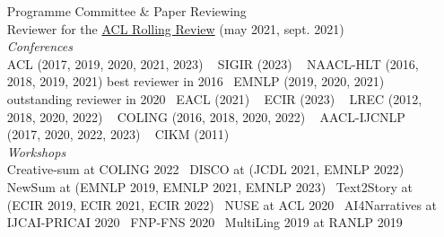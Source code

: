 \documentclass[11pt,a4paper]{article}
\begin{document}
\begin{itemize}
\begin{itemize}[
font=\normalfont\bfseries,
itemsep=.1cm,
wide=0cm,
labelsep*=.1cm]
\item[Programme Committee \& Paper Reviewing] ~\\[.2em]
  Reviewer for the \href{https://aclrollingreview.org/}{ACL Rolling Review} (may 2021, sept. 2021)\\[.2em]
  \textit{Conferences} \\[.2em]
  \hspace*{1em} ACL (2017, 2019, 2020, 2021, 2023) ~\newline
  \hspace*{1em} SIGIR (2023) ~\newline
  \hspace*{1em} NAACL-HLT (2016, 2018, 2019, 2021) \hfill best reviewer in 2016~\newline
  \hspace*{1em} EMNLP (2019, 2020, 2021) \hfill outstanding reviewer in 2020~\newline
  \hspace*{1em} EACL (2021) ~\newline
  \hspace*{1em} ECIR (2023) ~\newline
  \hspace*{1em} LREC (2012, 2018, 2020, 2022) ~\newline
  \hspace*{1em} COLING (2016, 2018, 2020, 2022) ~\newline
  \hspace*{1em} AACL-IJCNLP (2017, 2020, 2022, 2023) ~\newline
  \hspace*{1em} CIKM (2011) \\[.5em]
  \textit{Workshops} \\[.2em]
  \hspace*{1em} Creative-sum at COLING 2022~\newline
  \hspace*{1em} DISCO at (JCDL 2021, EMNLP 2022)~\newline
  \hspace*{1em} NewSum at (EMNLP 2019, EMNLP 2021, EMNLP 2023)~\newline
  \hspace*{1em} Text2Story at (ECIR 2019, ECIR 2021, ECIR 2022)~\newline
  \hspace*{1em} NUSE at ACL 2020~\newline
  \hspace*{1em} AI4Narratives at IJCAI-PRICAI 2020~\newline
  \hspace*{1em} FNP-FNS 2020~\newline
  \hspace*{1em} MultiLing 2019 at RANLP 2019~\newline


\end{itemize}
\end{itemize}
\end{document}
